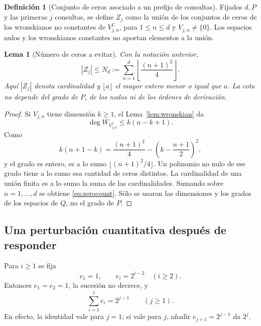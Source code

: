 \documentclass[11pt,a4paper]{article}
\numberwithin{equation}{section}
\newtheorem{lemma}[theorem]{Lema}
\theoremstyle{definition}
\newtheorem{definition}[theorem]{Definición}
\theoremstyle{remark}
\newcommand{\C}{\mathbb C}
\begin{document}
\begin{definition}[Conjunto de ceros asociado a un prefijo de consultas]\label{def:zeros}
Fijados $d,P$ y las primeras $j$ consultas, se define $Z_j$ como la unión de los conjuntos de ceros de los wronskianos no constantes de $V_{j,n}^{\C}$, para $1\le n\le d$ y $V_{j,n}\ne\{0\}$. Los espacios nulos y los wronskianos constantes no aportan elementos a la unión.
\end{definition}

\begin{lemma}[Número de ceros a evitar]\label{lem:zerocount}
Con la notación anterior,
\begin{equation}\label{eq:zerocount}
|Z_j|\le N_d:=\sum_{n=1}^d\left\lfloor\frac{(n+1)^2}{4}\right\rfloor.
\end{equation}
Aquí $|Z_j|$ denota cardinalidad y $\lfloor a\rfloor$ el mayor entero menor o igual que $a$. La cota no depende del grado de $P$, de los nodos ni de los órdenes de derivación.
\end{lemma}
\begin{proof}
Si $V_{j,n}$ tiene dimensión $k\ge1$, el Lema~\ref{lem:wronskian} da
\[
\deg W_{V_{j,n}^{\C}}\le k(n-k+1).
\]
Como
\[
k(n+1-k)=\frac{(n+1)^2}{4}-\left(k-\frac{n+1}{2}\right)^2,
\]
y el grado es entero, es a lo sumo $\lfloor(n+1)^2/4\rfloor$. Un polinomio no nulo de ese grado tiene a lo sumo esa cantidad de ceros distintos. La cardinalidad de una unión finita es a lo sumo la suma de las cardinalidades. Sumando sobre $n=1,\ldots,d$ se obtiene \eqref{eq:zerocount}. Sólo se usaron las dimensiones y los grados de los espacios de $Q$, no el grado de $P$.
\end{proof}

\subsection{Una perturbación cuantitativa después de responder}
Para $i\ge1$ se fija
\begin{equation}\label{eq:exponents}
e_1=1,\qquad e_i=2^{i-2}\quad(i\ge2).
\end{equation}
Entonces $e_1=e_2=1$, la sucesión no decrece, y
\begin{equation}\label{eq:sumexponents}
\sum_{i=1}^je_i=2^{j-1}\qquad(j\ge1).
\end{equation}
En efecto, la identidad vale para $j=1$; si vale para $j$, añadir $e_{j+1}=2^{j-1}$ da $2^j$.
\end{document}
